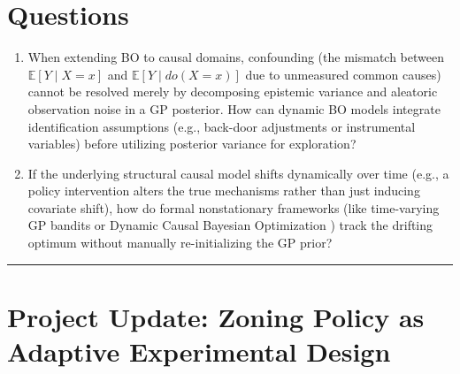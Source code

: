 \documentclass[11pt,twoside]{article}
\begin{document}
\section*{Questions}
\begin{enumerate}
    \item When extending BO to causal domains, confounding (the mismatch between $\mathbb{E}[Y \mid X=x]$ and $\mathbb{E}[Y \mid do(X=x)]$ due to unmeasured common causes) cannot be resolved merely by decomposing epistemic variance and aleatoric observation noise in a GP posterior. How can dynamic BO models integrate identification assumptions (e.g., back-door adjustments or instrumental variables) before utilizing posterior variance for exploration?
    \item If the underlying structural causal model shifts dynamically over time (e.g., a policy intervention alters the true mechanisms rather than just inducing covariate shift), how do formal nonstationary frameworks (like time-varying GP bandits \citep{bogunovic2016time} or Dynamic Causal Bayesian Optimization \citep{aglietti2021dcbo}) track the drifting optimum without manually re-initializing the GP prior?
\end{enumerate}

\newpage
\vspace{1em}
\hrule
\vspace{1em}
\section*{Project Update: Zoning Policy as Adaptive Experimental Design}
\thispagestyle{empty}

\begin{abstract}
My project formalizes the prediction of protest petitions against housing developments as an Empirical Risk Minimization (ERM) problem subject to spatial and temporal domain shifts. Building on our invariant causal prediction framing, this update explores framing municipal rezoning interventions not as static treatments, but as an ongoing \textit{constrained Bayesian Optimization} problem managed by the city council.
\end{abstract}
\end{document}
